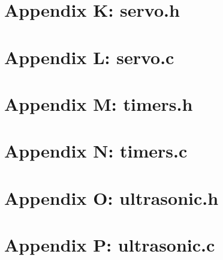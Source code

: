 \documentclass[letterpaper,11pt]{texMemo} %
\begin{document}
\section*{Appendix K: servo.h}
\begin{tiny}

\end{tiny}
\newpage

\section*{Appendix L: servo.c}
\begin{tiny}

\end{tiny}
\newpage

\section*{Appendix M: timers.h}
\begin{tiny}

\end{tiny}
\newpage

\section*{Appendix N: timers.c}
\begin{tiny}

\end{tiny}
\newpage

\section*{Appendix O: ultrasonic.h}
\begin{tiny}

\end{tiny}
\newpage

\section*{Appendix P: ultrasonic.c}
\begin{tiny}

\end{tiny}
\newpage
\end{document}
